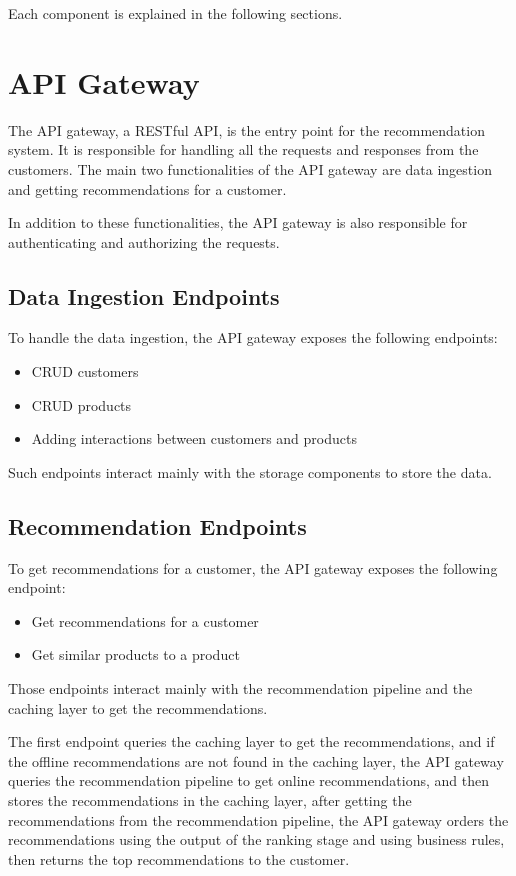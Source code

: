 Each component is explained in the following sections.

\section{API Gateway}

The API gateway, a RESTful API, is the entry point for the recommendation system.
It is responsible for handling all the requests and responses from the customers.
The main two functionalities of the API gateway are data ingestion and getting recommendations for a customer.

In addition to these functionalities, the API gateway is also responsible for authenticating and authorizing the requests.

\subsection{Data Ingestion Endpoints}

To handle the data ingestion, the API gateway exposes the following endpoints:
\begin{itemize}
    \item CRUD customers
    \item CRUD products
    \item Adding interactions between customers and products
\end{itemize}

Such endpoints interact mainly with the storage components to store the data.

\subsection{Recommendation Endpoints}

To get recommendations for a customer, the API gateway exposes the following endpoint:
\begin{itemize}
    \item Get recommendations for a customer
    \item Get similar products to a product
\end{itemize}

Those endpoints interact mainly with the recommendation pipeline and the caching layer to get the recommendations.

The first endpoint queries the caching layer to get the recommendations, and if the offline recommendations are not found in the caching layer, 
the API gateway queries the recommendation pipeline to get online recommendations, and then stores the recommendations in the caching layer, 
after getting the recommendations from the recommendation pipeline, 
the API gateway orders the recommendations using the output of the ranking stage and using business rules, then returns the top recommendations to the customer.


